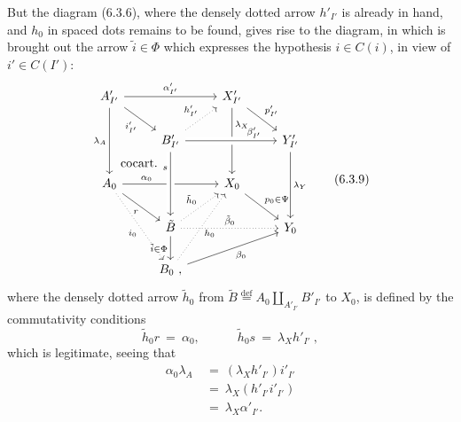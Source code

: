 But the diagram (6.3.6), where the densely dotted arrow $h'_{I'}$ is already in hand, and $h_0$ in spaced dots remains to be found, gives rise to the diagram, in which is brought out the arrow $\tilde{i} \in \Phi$ which expresses the hypothesis $i \in C(i)$, %
in view of $i' \in C(I')$:
\[
\begin{tikzcd}
A'_{I'} \arrow[rr, "\alpha'_{I'}"] \arrow[dr, "i'_{I'}"'] \arrow[dd, "\lambda_A"'] & & X'_{I'} \arrow[dr, "p'_{I'}"] \arrow[dd, "\lambda_X" near start] & \\
 & B'_{I'} \arrow[ur, dotted, "h'_{I'}"] \arrow[rr, crossing over, "\beta'_{I'}" near end] & & Y'_{I'} \arrow[dd, "\lambda_Y"] \\
A_0 \arrow[ur, phantom, "\text{cocart.}"] \arrow[rr, "\alpha_0" near start] \arrow[dr, "r"'] \arrow[ddr, dotted, "i_0"'] & & X_0 \arrow[dr, "p_0\in\Psi"] & \\
 & \tilde{B} \arrow[from=2-2, crossing over, "s"' near start] \arrow[ur, dotted, "\tilde{h}_0"] \arrow[rr, dotted, "\tilde{\beta}_0"] \arrow[d, "\tilde{i}\in\Phi"'] & & Y_0 \\
 & B_0\ , \arrow[uur, dotted, "h_0"'] \arrow[urr, "\beta_0"'] & &
\end{tikzcd}
\tag*{(6.3.9)}
\]
where the densely dotted arrow $\tilde{h}_0$ from $\tilde{B} \overset{\text{def}}{=} A_0 \amalg_{A'_{I'}} B'_{I'}$ to $X_0$, is defined by the commutativity conditions
\[
\tilde{h}_0r \ =\ \alpha_0, \qquad\quad \tilde{h}_0s \ =\ \lambda_X h'_{I'}\ ,
\tag*{(6.3.10)}
\]
which is legitimate, seeing that
\[
\begin{aligned}
\alpha_0\lambda_A \ &=\ (\lambda_X h'_{I'})i'_{I'} \\
&=\ \lambda_X(h'_{I'}i'_{I'}) \\
&=\ \lambda_X\alpha'_{I'}.
\end{aligned}
\]

